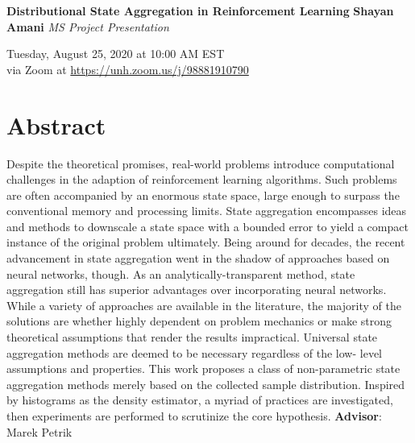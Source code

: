 \documentclass[11pt]{article}
\begin{document}
    \begin{flushleft}
        \LARGE \textbf{Distributional State Aggregation in Reinforcement Learning}
        \newline \break
        \Large \textbf{Shayan Amani}
        \newline \break
        \textit{MS Project Presentation}
        \newline \break

        Tuesday, August 25, 2020 at 10:00 AM EST \\
        via Zoom at \href{https://unh.zoom.us/j/98881910790}{https://unh.zoom.us/j/98881910790}

    \end{flushleft}
    \section*{Abstract}

    Despite the theoretical promises, real-world problems introduce computational challenges in the adaption of reinforcement learning algorithms.
    Such problems are often accompanied by an enormous state space, large enough to surpass the conventional memory and processing limits.
    State aggregation encompasses ideas and methods to downscale a state space with a bounded error to yield a compact instance of the original problem ultimately.
    Being around for decades, the recent advancement in state aggregation went in the shadow of approaches based on neural networks, though.
    As an analytically-transparent method, state aggregation still has superior advantages over incorporating neural networks. \\

    While a variety of approaches are available in the literature, the majority of the solutions are whether highly dependent on problem mechanics or make strong theoretical assumptions that render the results impractical.
    Universal state aggregation methods are deemed to be necessary regardless of the low- level assumptions and properties.
    This work proposes a class of non-parametric state aggregation methods merely based on the collected sample distribution.
    Inspired by histograms as the density estimator, a myriad of practices are investigated, then experiments are performed to scrutinize the core hypothesis.
    \newline \break
    \textbf{Advisor}: \\
    Marek Petrik
\end{document}
